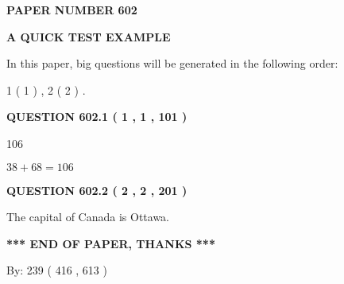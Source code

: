 \documentclass[12pt]{article}
\begin{document}
   
 {\textbf{ \Large{ PAPER NUMBER  602  }}}
   
   
\vspace{0.2in}
   
   
   
   
   
   
 \vspace{0.2in}
{\LARGE {\textbf{ A QUICK TEST EXAMPLE}}}
   
   
   
\vspace{0.2in}
   
In this paper, big questions will be generated in the following order: 
   
   
   1 ( 1 )
 ,
   2 ( 2 )
 .
  
\vspace{0.2in}
  
{\textbf{\Large{QUESTION
602.1 
 ( 1 , 1 , 101 )
}}}
  
  
 
 
\noindent{}

106
 
 
 
 
\noindent{}

$ %
38 +  %
68=   %
106$
 
 
  
\vspace{0.2in}
  
{\textbf{\Large{QUESTION
602.2 
 ( 2 , 2 , 201 )
}}}
  
  
 
 
\noindent{}
 
 
The capital of Canada is Ottawa.
 
 
 
 
   
   
 \vspace{0.2in}
 
   
   
   
   
\vspace{1.0in} 
{\textbf{\large{ *** END OF PAPER, THANKS *** }}} 
   
   
\hspace{1.0in} By: 
 239 ( 416 ,  613 )
   
\end{document}
